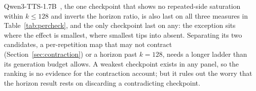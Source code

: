 Qwen3-TTS-1.7B~\cite{hu2026qwen3tts}, the one checkpoint that shows no repeated-side saturation
within $k\le128$ and inverts the horizon ratio, is also last on all three measures in
Table~\ref{tab:percheck}, and the only checkpoint last on any: the exception sits
where the effect is smallest, where smallest tips into absent. Separating its two candidates, a
per-repetition map that may not contract (Section~\ref{sec:contraction}) or a horizon past
$k=128$, needs a longer ladder than its generation budget allows. A weakest checkpoint exists
in any panel, so the ranking is no evidence for the contraction account; but it rules out the worry that
the horizon result rests on discarding a contradicting checkpoint.

